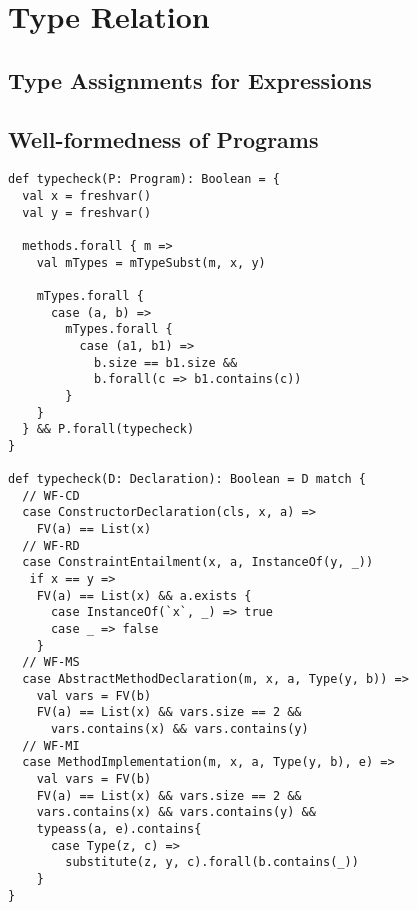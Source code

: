 \section{Type Relation}
\subsection{Type Assignments for Expressions}

\subsection{Well-formedness of Programs}
\begin{lstlisting}[caption={Well-formedness},label=lst:wf,captionpos=b,frame={lines}]
def typecheck(P: Program): Boolean = {
  val x = freshvar()
  val y = freshvar()

  methods.forall { m =>
    val mTypes = mTypeSubst(m, x, y)

    mTypes.forall {
      case (a, b) =>
        mTypes.forall {
          case (a1, b1) =>
            b.size == b1.size &&
            b.forall(c => b1.contains(c))
        }
    }
  } && P.forall(typecheck)
}

def typecheck(D: Declaration): Boolean = D match {
  // WF-CD
  case ConstructorDeclaration(cls, x, a) =>
    FV(a) == List(x)
  // WF-RD
  case ConstraintEntailment(x, a, InstanceOf(y, _))
   if x == y =>
    FV(a) == List(x) && a.exists {
      case InstanceOf(`x`, _) => true
      case _ => false
    }
  // WF-MS
  case AbstractMethodDeclaration(m, x, a, Type(y, b)) =>
    val vars = FV(b)
    FV(a) == List(x) && vars.size == 2 &&
      vars.contains(x) && vars.contains(y)
  // WF-MI
  case MethodImplementation(m, x, a, Type(y, b), e) =>
    val vars = FV(b)
    FV(a) == List(x) && vars.size == 2 &&
    vars.contains(x) && vars.contains(y) &&
    typeass(a, e).contains{
      case Type(z, c) =>
        substitute(z, y, c).forall(b.contains(_))
    }
}
\end{lstlisting}

